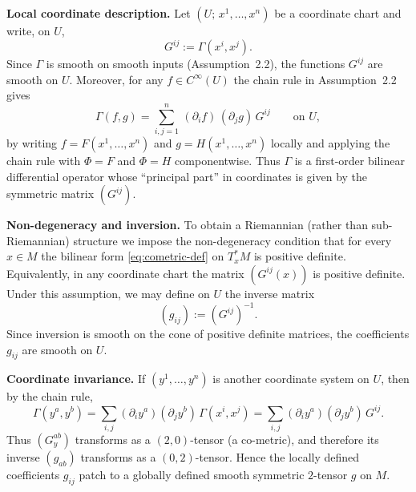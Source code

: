 \documentclass[11pt]{amsart}
\theoremstyle{definition}
\theoremstyle{remark}
\begin{document}
\medskip
\noindent\textbf{Local coordinate description.}
Let $(U;\,x^1,\dots,x^n)$ be a coordinate chart and write, on $U$,
\begin{equation}\label{eq:Gij}
G^{ij} := \Gamma(x^i,x^j).
\end{equation}
Since $\Gamma$ is smooth on smooth inputs (Assumption~2.2), the functions $G^{ij}$ are smooth
on $U$.  Moreover, for any $f\in C^\infty(U)$ the chain rule in Assumption~2.2 gives
\begin{equation}\label{eq:Gamma-symbol}
\Gamma(f,g)
=
\sum_{i,j=1}^n \,(\partial_i f)\,(\partial_j g)\,G^{ij}
\qquad\text{on }U,
\end{equation}
by writing $f=F(x^1,\dots,x^n)$ and $g=H(x^1,\dots,x^n)$ locally and applying the chain rule
with $\Phi=F$ and $\Phi=H$ componentwise.
Thus $\Gamma$ is a first-order bilinear differential operator whose ``principal part'' in
coordinates is given by the symmetric matrix $(G^{ij})$.

\medskip
\noindent\textbf{Non-degeneracy and inversion.}
To obtain a Riemannian (rather than sub-Riemannian) structure we impose the non-degeneracy
condition that for every $x\in M$ the bilinear form \eqref{eq:cometric-def} on $T_x^*M$
is positive definite.  Equivalently, in any coordinate chart the matrix $(G^{ij}(x))$ is
positive definite.  Under this assumption, we may define on $U$ the inverse matrix
\begin{equation}\label{eq:gij}
(g_{ij}) := (G^{ij})^{-1}.
\end{equation}
Since inversion is smooth on the cone of positive definite matrices, the coefficients
$g_{ij}$ are smooth on $U$.

\medskip
\noindent\textbf{Coordinate invariance.}
If $(y^1,\dots,y^n)$ is another coordinate system on $U$, then by the chain rule,
\[
\Gamma(y^a,y^b)
=
\sum_{i,j} (\partial_i y^a)(\partial_j y^b)\,\Gamma(x^i,x^j)
=
\sum_{i,j} (\partial_i y^a)(\partial_j y^b)\,G^{ij}.
\]
Thus $(G^{ab}_y)$ transforms as a $(2,0)$-tensor (a co-metric), and therefore its inverse
$(g_{ab})$ transforms as a $(0,2)$-tensor.  Hence the locally defined coefficients
$g_{ij}$ patch to a globally defined smooth symmetric $2$-tensor $g$ on $M$.
\end{document}

